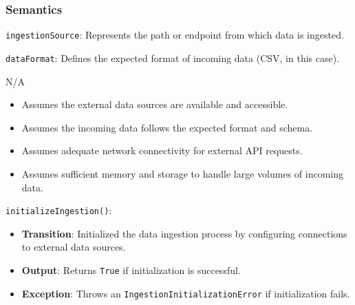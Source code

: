 \documentclass[12pt, titlepage]{article}
\begin{document}
\subsubsection{Semantics}
\begin{description}
  \item[State Variables:]
  \item
  \texttt{ingestionSource}: Represents the path or endpoint from which data is ingested.
  \item
  \texttt{dataFormat}: Defines the expected format of incoming data (CSV, in this case).

  \item[Environment Variables:] N/A

  \item[Assumptions:]
  \item
  \begin{itemize}
    \item Assumes the external data sources are available and accessible.
  \end{itemize}
  \item
  \begin{itemize}
    \item Assumes the incoming data follows the expected format and schema.
  \end{itemize}
  \item 
  \begin{itemize}
    \item Assumes adequate network connectivity for external API requests.
  \end{itemize}
  \item
  \begin{itemize}
    \item Assumes sufficient memory and storage to handle large volumes of incoming data.
  \end{itemize}

  \item[Access Routine Semantics:] 
  \item
  \texttt{initializeIngestion()}:
  \item
  \begin{itemize}
    \item \textbf{Transition}: Initialized the data ingestion process by configuring connections to
    external data sources.
  \end{itemize}
  \item
  \begin{itemize}
    \item \textbf{Output}: Returns \texttt{True} if initialization is successful.
  \end{itemize}
  \item
  \begin{itemize}
    \item \textbf{Exception}: Throws an \texttt{IngestionInitializationError} if
    initialization fails.
  \end{itemize}
  \item 


\end{description}
\end{document}
